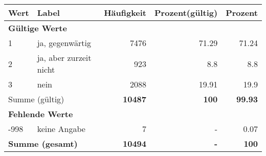      \begin{longtable}{lXrrr}
     \toprule
     \textbf{Wert} & \textbf{Label} & \textbf{Häufigkeit} & \textbf{Prozent(gültig)} & \textbf{Prozent} \\
     \endhead
     \midrule
     \multicolumn{5}{l}{\textbf{Gültige Werte}}\\

     1 &
     \multicolumn{1}{X}{ ja, gegenwärtig   } &


       \num{7476} &
       \num[round-mode=places,round-precision=2]{71,29} &
         \num[round-mode=places,round-precision=2]{71,24} \\

     2 &
     \multicolumn{1}{X}{ ja, aber zurzeit nicht   } &


       \num{923} &
       \num[round-mode=places,round-precision=2]{8,8} &
         \num[round-mode=places,round-precision=2]{8,8} \\

     3 &
     \multicolumn{1}{X}{ nein   } &


       \num{2088} &
       \num[round-mode=places,round-precision=2]{19,91} &
         \num[round-mode=places,round-precision=2]{19,9} \\
     \midrule
     \multicolumn{2}{l}{Summe (gültig)} &
       \textbf{\num{10487}} &
     \textbf{100} &
       \textbf{\num[round-mode=places,round-precision=2]{99,93}} \\
     \multicolumn{5}{l}{\textbf{Fehlende Werte}}\\
       -998 &
       keine Angabe &
         \num{7} &
        - &
         \num[round-mode=places,round-precision=2]{0,07} \\
     \midrule
     \multicolumn{2}{l}{\textbf{Summe (gesamt)}} &
          \textbf{\num{10494}} &
        \textbf{-} &
        \textbf{100} \\
     \bottomrule
     \end{longtable}
     
